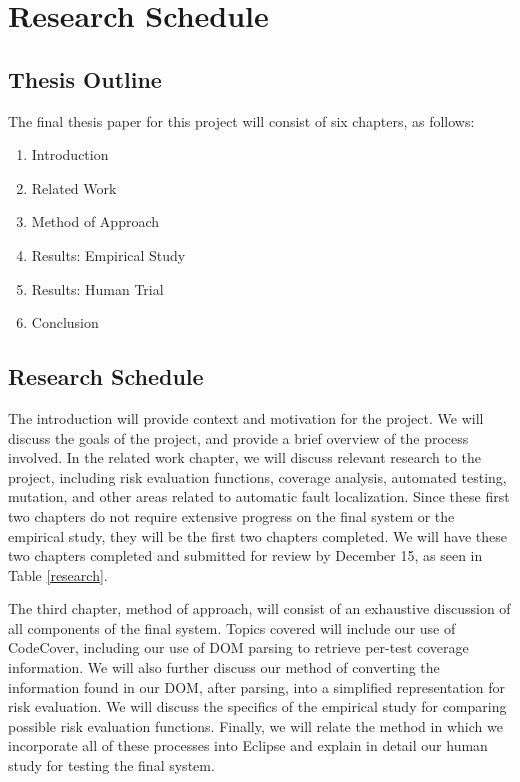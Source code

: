 \documentclass[11pt]{article}
\begin{document}
\vspace*{-.1in}
\section{Research Schedule}
\label{sec:schedule}
\vspace*{-.1in}

\subsection{Thesis Outline}
The final thesis paper for this project will consist of six chapters, 
as follows:
\begin{enumerate}
\item Introduction
\item Related Work
\item Method of Approach
\item Results: Empirical Study
\item Results: Human Trial
\item Conclusion
\end{enumerate}

\subsection{Research Schedule}
The introduction will provide context and motivation for the project.
We will discuss the goals of the project, and provide a brief overview
of the process involved.  In the related work chapter, we will discuss
relevant research to the project, including risk evaluation functions,
coverage analysis, automated testing, mutation, and other areas
related to automatic fault localization.  Since these first two chapters
do not require extensive progress on the final system or the empirical
study, they will be the first two chapters completed.  We will have these
two chapters completed and submitted for review by December 15, as seen
in Table \ref{research}.

The third chapter, method of approach, will consist of an exhaustive
discussion of all components of the final system.  Topics covered
will include our use of CodeCover, including our use of DOM parsing
to retrieve per-test coverage information.  We will also further
discuss our method of converting the information found in our DOM,
after parsing, into a simplified representation for risk evaluation.
We will discuss the specifics of the empirical study for comparing
possible risk evaluation functions.  Finally, we will relate the
method in which we incorporate all of these processes into Eclipse
and explain in detail our human study for testing the final system.
\end{document}
